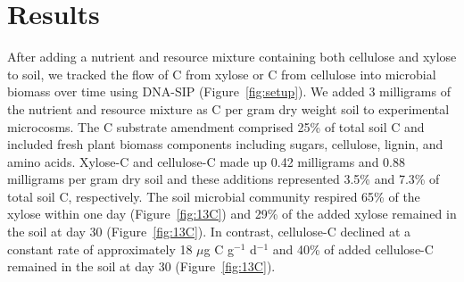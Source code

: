 \section{Results}
After adding a nutrient and resource mixture containing
both cellulose and xylose to soil, we tracked the flow of C from xylose or
C from cellulose into microbial biomass over time using DNA-SIP
(Figure~\ref{fig:setup}). We added 3 milligrams of the nutrient and resource
mixture as C per gram dry weight soil to experimental microcosms. The
C substrate amendment comprised 25\% of total soil C and included fresh plant
biomass components including sugars, cellulose, lignin, and amino acids.
Xylose-C and cellulose-C made up 0.42 milligrams and 0.88 milligrams per gram
dry soil and these additions represented 3.5\% and 7.3\% of total soil C,
respectively. The soil microbial community respired 65\% of the xylose within
one day (Figure~\ref{fig:13C}) and 29\% of the added xylose remained in the
soil at day 30 (Figure~\ref{fig:13C}). In contrast, cellulose-C declined at
a constant rate of approximately 18 $\mu$g C g$^{-1}$ d$^{-1}$ and 40\% of
added cellulose-C remained in the soil at day 30 (Figure~\ref{fig:13C}). 

